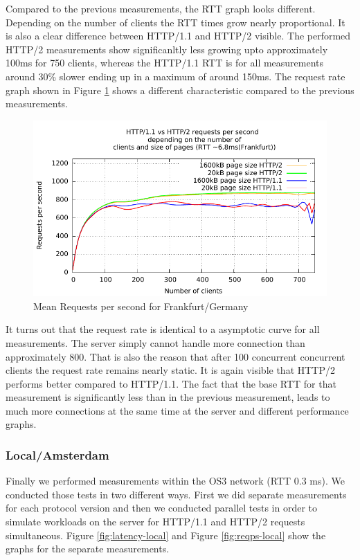 Compared to the previous measurements, the RTT graph looks different. Depending on the number of clients the RTT times grow nearly proportional. It is also a clear difference between HTTP/1.1 and HTTP/2 visible. The performed HTTP/2 measurements show significanltly less growing upto approximately 100ms for 750 clients, whereas the HTTP/1.1 RTT is for all measurements around 30\% slower ending up in a maximum of around 150ms. The  request rate graph shown in Figure \ref{fig:reqps-frankfurt} shows a different characteristic compared to the previous measurements.

\begin{figure}[H]
	\centering
	\includegraphics[scale=1,trim=0.0cm .0cm .0cm .0cm,clip]{images/reqps-frankfurt.pdf}
	\caption{Mean Requests per second for Frankfurt/Germany}
	\label{fig:reqps-frankfurt}
\end{figure}

It turns out that the request rate is identical to a asymptotic curve for all measurements. The server simply cannot handle more connection than approximately 800. That is also the reason that after 100 concurrent concurrent clients the request rate remains nearly static. It is again visible that HTTP/2 performs better compared to HTTP/1.1. The fact that the base RTT for that measurement is significantly less than in the previous measurement, leads to much more connections at the same time at the server and different performance graphs.

\subsubsection{Local/Amsterdam}

Finally we performed measurements within the OS3 network (RTT 0.3 ms). We conducted those tests in two different ways. First we did separate measurements for each protocol version and then we conducted parallel tests in order to simulate workloads on the server for HTTP/1.1 and HTTP/2 requests simultaneous. Figure \ref{fig:latency-local} and Figure \ref{fig:reqps-local} show the graphs for the separate measurements.


